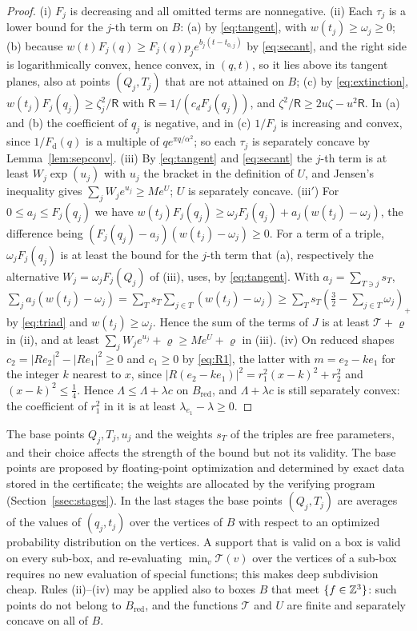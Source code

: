 \begin{proof}
(i) $F_j$ is decreasing and all omitted terms are nonnegative.
(ii) Each $\tau_j$ is a lower bound for the $j$-th term on $B$: (a) by \eqref{eq:tangent}, with $w(t_j)\ge\omega_j\ge0$; (b) because
$w(t)F_j(q)\ge F_j(q)p_je^{b_j(t-t_{0,j})}$ by \eqref{eq:secant}, and the right side is logarithmically convex, hence convex, in $(q,t)$,
so it lies above its tangent planes, also at points $(Q_j,T_j)$ that are not attained on $B$; (c) by \eqref{eq:extinction},
$w(t_j)F_j(q_j)\ge\zeta_j^2/\mathsf R$ with $\mathsf R=1/(c_dF_j(q_j))$, and $\zeta^2/\mathsf R\ge2u\zeta-u^2\mathsf R$. In (a) and (b)
the coefficient of $q_j$ is negative, and in (c) $1/F_j$ is increasing and convex, since $1/F_{\mathrm d}(q)$ is a multiple of
$qe^{\pi q/\alpha^2}$; so each $\tau_j$ is separately concave by Lemma~\ref{lem:sepconv}.
(iii) By \eqref{eq:tangent} and \eqref{eq:secant} the $j$-th term is at least $W_j\exp(u_j)$ with $u_j$ the bracket in the definition
of $U$, and Jensen's inequality gives $\sum_jW_je^{u_j}\ge Me^U$; $U$ is separately concave.
(iii$'$) For $0\le a_j\le F_j(q_j)$ we have $w(t_j)F_j(q_j)\ge\omega_jF_j(q_j)+a_j(w(t_j)-\omega_j)$, the difference being
$(F_j(q_j)-a_j)(w(t_j)-\omega_j)\ge0$. For a term of a triple, $\omega_jF_j(q_j)$ is at least the bound for the $j$-th term that
\textup{(a)}, respectively the alternative $W_j=\omega_jF_j(Q_j)$ of \textup{(iii)}, uses, by \eqref{eq:tangent}. With
$a_j=\sum_{T\ni j}s_T$,
$\sum_ja_j(w(t_j)-\omega_j)=\sum_Ts_T\sum_{j\in T}(w(t_j)-\omega_j)\ge\sum_Ts_T(\frac32-\sum_{j\in T}\omega_j)_+$ by \eqref{eq:triad} and
$w(t_j)\ge\omega_j$. Hence the sum of the terms of $J$ is at least $\mathcal T+\varrho$ in \textup{(ii)}, and at least
$\sum_jW_je^{u_j}+\varrho\ge Me^U+\varrho$ in \textup{(iii)}.
(iv) On reduced shapes $c_2=|Re_2|^2-|Re_1|^2\ge0$ and $c_1\ge0$ by \eqref{eq:R1}, the latter with $m=e_2-ke_1$ for the integer $k$
nearest to $x$, since $|R(e_2-ke_1)|^2=r_1^2(x-k)^2+r_2^2$ and $(x-k)^2\le\frac14$. Hence $\Lambda\le\Lambda+\lambda c$ on
$B_{\mathrm{red}}$, and $\Lambda+\lambda c$ is still separately convex: the coefficient of $r_1^2$ in it is at least
$\lambda_{e_1}-\lambda\ge0$.
\end{proof}

The base points $Q_j,T_j,u_j$ and the weights $s_T$ of the triples are free parameters, and their choice affects the strength of
the bound but not its validity. The base points are proposed by floating-point optimization and determined by exact data stored
in the certificate; the weights are allocated by the verifying program (Section~\ref{ssec:stages}). In the last stages the base
points $(Q_j,T_j)$ are averages of the values of $(q_j,t_j)$ over the
vertices of $B$ with respect to an optimized probability distribution on the vertices. A support that is valid on a box is valid
on every sub-box, and re-evaluating $\min_v\mathcal T(v)$ over the vertices of a sub-box requires no new evaluation of special
functions; this makes deep subdivision cheap. Rules (ii)--(iv) may be applied also to boxes $B$ that meet $\{f\in\mathbb Z^3\}$: such
points do not belong to $B_{\mathrm{red}}$, and the functions $\mathcal T$ and $U$ are finite and separately concave on all of $B$.


